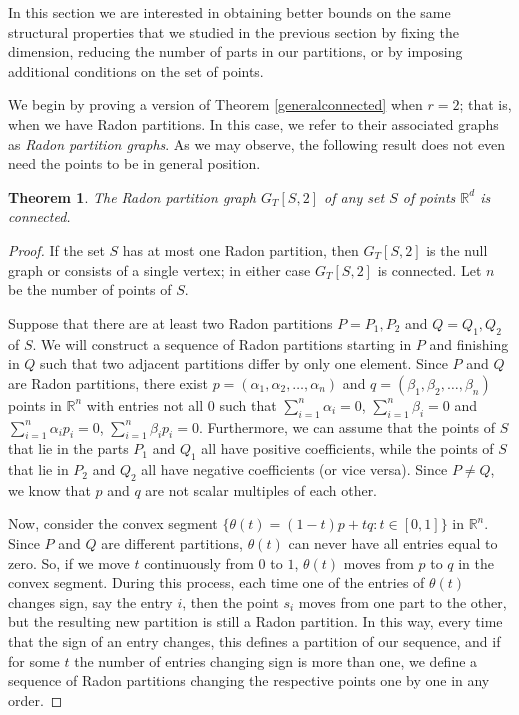 \documentclass[11pt,a4paper]{article}
\theoremstyle{plain}
\newtheorem{theorem}{Theorem}[section]
\theoremstyle{definition}
\newcommand{\rr}{\mathds{R}}
\begin{document}
In this section we are interested in obtaining better bounds on the same structural properties that we studied in the previous section by fixing the dimension, reducing the number of parts in our partitions, or by imposing additional conditions on the set of points.  

We begin by proving a version of Theorem \ref{generalconnected} when $r=2$; that is, when we have Radon partitions. In this case, we refer to their associated graphs as \emph{Radon partition graphs}. As we may observe, the following result does not even need the points to be in general position. 

\begin{theorem}\label{radon is alway connected}
The Radon partition graph $G_T[S,2]$ of any set $S$ of points $\rr^d$ is connected. 
\end{theorem}

\begin{proof}
If the set $S$ has at most one Radon partition, then $G_T[S,2]$ is the null graph or consists of a single vertex; in either case $G_T[S,2]$ is connected. Let $n$ be the number of points of $S$.

Suppose that there are at least two Radon partitions $P=P_1, P_2$ and $Q=Q_1, Q_2$ of $S$. We will construct a sequence of Radon partitions starting in $P$ and finishing in $Q$ such that two adjacent partitions differ by only one element.  
Since $P$ and $Q$ are Radon partitions, there exist $p=(\alpha_1,\alpha_2,\dots ,\alpha_{n})$ and $q=(\beta_1,\beta_2,\dots ,\beta_{n})$ points in $\rr^{n}$ with entries not all $0$ such that $\sum_{i=1}^{n}\alpha_i=0$, $\sum_{i=1}^{n}\beta_i=0$ and $\sum_{i=1}^{n}\alpha_i p_i=0$, $\sum_{i=1}^{n}\beta_i p_i=0$. Furthermore, we can assume that the points of $S$ that lie in the parts $P_1$ and $Q_1$ all have positive coefficients, while the points of $S$ that lie in $P_2$ and $Q_2$ all have negative coefficients (or vice versa).  Since $P \neq Q$, we know that $p$ and $q$ are not scalar multiples of each other.

Now, consider the convex segment $\{\theta(t)=(1-t)p+tq \colon t\in[0,1]\}$ in $\rr^{n}$. Since $P$ and $Q$ are different partitions,  $\theta(t)$ can never have all entries equal to zero.
So, if we move $t$ continuously from $0$ to $1$, $\theta(t)$ moves from $p$ to $q$ in the convex segment. During this process, each time one of the entries of $\theta(t)$ changes sign, say the entry $i$, then the point $s_i$ moves from one part to the other, but the resulting new partition is still a Radon partition.
In this way, every time that the sign of an entry changes, this defines a partition of our sequence, and if for some $t$ the number of entries changing sign is more than one, we define a sequence of Radon partitions changing the respective points one by one in any order.   
\end{proof}
\end{document}
